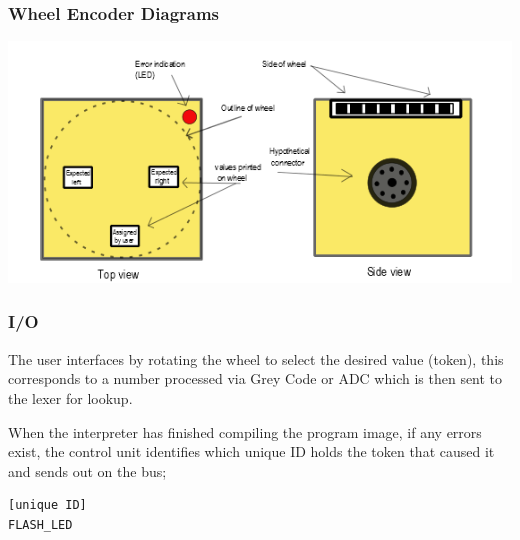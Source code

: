 \subsubsection{Wheel Encoder Diagrams}
\includegraphics{BlkFace.png}
\subsubsection{I/O}
The user interfaces by rotating the wheel to select the desired value (token), this corresponds to a number processed via Grey Code or ADC which is then sent to the lexer for lookup.

When the interpreter has finished compiling the program image, if any errors exist, the control unit identifies which unique ID holds the token that caused it and sends out on the bus;
\begin{verbatim}
[unique ID]
FLASH_LED
\end{verbatim}

